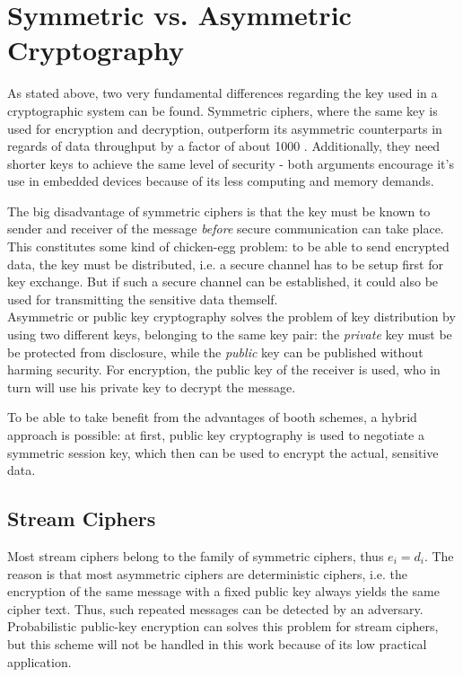 \section{Symmetric vs. Asymmetric Cryptography}

As stated above, two very fundamental differences regarding the key used in a cryptographic system can be found. Symmetric ciphers, where 
the same key is used for encryption and decryption, outperform its asymmetric counterparts in regards of data throughput by a factor of about 1000 \cite{5412055}.
Additionally, they need shorter keys to achieve the same level of security - both arguments encourage it's use in embedded devices because of its less computing
and memory demands.

The big disadvantage of symmetric ciphers is that the key must be known to sender
and receiver of the message \textit{before} secure communication can take place. This constitutes some kind of chicken-egg problem: to be able to send encrypted
data, the key must be distributed, i.e. a secure channel has to be setup first for key exchange. But if such a secure channel can be established, it could also be used
for transmitting the sensitive data themself.
\\

Asymmetric or public key cryptography solves the problem of key distribution by using two different keys, belonging to the same key pair: the \textit{private}
key must be be protected from disclosure, while the \textit{public} key can be published without harming security. For encryption, the public key of the receiver
is used, who in turn will use his private key to decrypt the message. 

To be able to take benefit from the advantages of booth schemes, a hybrid approach is possible: at first, public key cryptography is used to negotiate a symmetric session
key, which then can be used to encrypt the actual, sensitive data.

\subsection{Stream Ciphers}

Most stream ciphers belong to the family of symmetric ciphers, thus $e_i = d_i$. The reason is that most asymmetric ciphers are deterministic ciphers,
i.e. the encryption of the same message with a fixed public key always yields the same cipher text. Thus, such repeated messages can be detected by 
an adversary. 
Probabilistic public-key encryption can solves this problem for stream ciphers,
but this scheme will not be handled in this work because of its low practical application.


